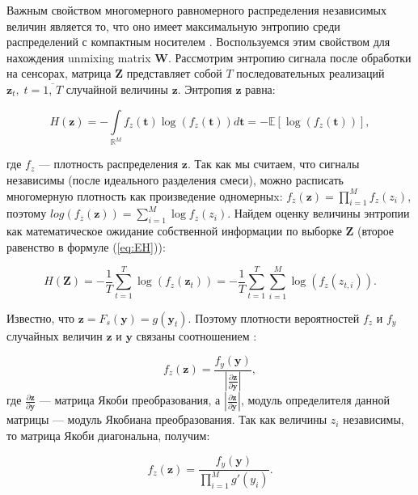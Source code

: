 \documentclass[a4paper,12pt]{article}
\begin{document}
	Важным свойством многомерного равномерного распределения независимых величин является то, что оно имеет максимальную энтропию среди распределений с компактным носителем \cite{stone2004ica}. Воспользуемся этим свойством для нахождения unmixing matrix $ \mathbf{W} $. Рассмотрим энтропию сигнала после обработки на сенсорах, матрица $\mathbf{Z}$ представляет собой $T$ последовательных реализаций $\mathbf{z}_t,\; t=\overline{1,\,T}$ случайной величины $\mathbf{z}$. Энтропия $\mathbf{z}$ равна:
	
	\begin{equation} \label{eq:EH}
		H(\mathbf{z}) = -\int\limits_{\mathbb{R}^M} f_z(\mathbf{t}) \log(f_z(\mathbf{t})) d\mathbf{t} = 
		 - \mathbb{E}\left[ \log(f_z(\mathbf{t})) \right], 
	\end{equation}
	
	где $f_z$ --- плотность распределения $\mathbf{z}$. Так как мы считаем, что сигналы независимы (после идеального разделения смеси), можно расписать многомерную плотность как произведение одномерныx: $f_z(\mathbf{z}) = \prod_{i=1}^{M}f_z(z_i)$, поэтому $log(f_z(\mathbf{z})) = \sum_{i=1}^{M} \log f_z(z_i)$. Найдем оценку величины энтропии как математическое ожидание собственной информации по выборке $\mathbf{Z}$ (второе равенство в формуле  (\ref{eq:EH})):
	
	\begin{equation} \label{eq:Hsum}
		H(\mathbf{Z}) = -\frac{1}{T} \sum\limits_{t=1}^{T} \log(f_z(\mathbf{z}_t)) = 
						-\frac{1}{T} \sum\limits_{t=1}^{T} \sum\limits_{i=1}^{M} \log(f_z(z_{t,i})).
	\end{equation}
	
	Известно, что $\mathbf{z} = F_s(\mathbf{y}) = g(\mathbf{y}_t)$. Поэтому плотности вероятностей $f_z$ и $ f_y $  случайных величин $ \mathbf{z} $ и $ \mathbf{y} $ связаны соотношением \cite{kelbert2007stat}:
	
	\begin{equation}
		f_z(\mathbf{z}) = \frac{f_y(\mathbf{y})}{\left|\frac{\partial \mathbf{z}}{\partial \mathbf{y}}\right|},
	\end{equation}
	где $\frac{\partial \mathbf{z}}{\partial \mathbf{y}}$ --- матрица Якоби преобразования, а ${\left|\frac{\partial \mathbf{z}}{\partial \mathbf{y}}\right|}$, модуль определителя данной матрицы --- модуль Якобиана преобразования. Так как величины $z_i$ независимы, то матрица Якоби диагональна, получим:
	
	\begin{equation} \label{eq:f_z_g_same}
	f_z(\mathbf{z}) = \frac{f_y(\mathbf{y})}{\prod_{i=1}^{M} g'(y_i)}.
	\end{equation}
	
\end{document}
